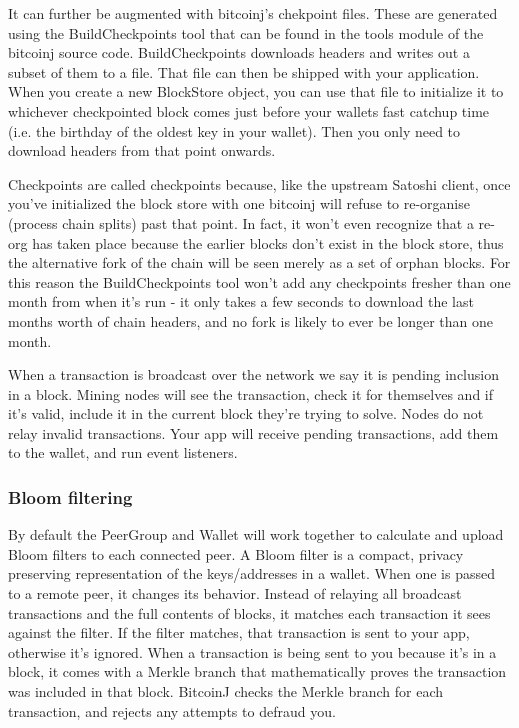 \documentclass[a4paper,12pt]{article}
\begin{document}
It can further be augmented with bitcoinj's chekpoint files. These are generated using the BuildCheckpoints tool that can be found in the tools module of the bitcoinj source code. BuildCheckpoints downloads headers and writes out a subset of them to a file. That file can then be shipped with your application. When you create a new BlockStore object, you can use that file to initialize it to whichever checkpointed block comes just before your wallets fast catchup time (i.e. the birthday of the oldest key in your wallet). Then you only need to download headers from that point onwards.

Checkpoints are called checkpoints because, like the upstream Satoshi client, once you've initialized the block store with one bitcoinj will refuse to re-organise (process chain splits) past that point. In fact, it won't even recognize that a re-org has taken place because the earlier blocks don't exist in the block store, thus the alternative fork of the chain will be seen merely as a set of orphan blocks. For this reason the BuildCheckpoints tool won't add any checkpoints fresher than one month from when it's run - it only takes a few seconds to download the last months worth of chain headers, and no fork is likely to ever be longer than one month.

When a transaction is broadcast over the network we say it is pending inclusion in a block. Mining nodes will see the transaction, check it for themselves and if it's valid, include it in the current block they're trying to solve. Nodes do not relay invalid transactions. Your app will receive pending transactions, add them to the wallet, and run event listeners. 

\subsubsection{Bloom filtering}
By default the PeerGroup and Wallet will work together to calculate and upload Bloom filters to each connected peer. A Bloom filter is a compact, privacy preserving representation of the keys/addresses in a wallet. When one is passed to a remote peer, it changes its behavior. Instead of relaying all broadcast transactions and the full contents of blocks, it matches each transaction it sees against the filter. If the filter matches, that transaction is sent to your app, otherwise it's ignored. When a transaction is being sent to you because it's in a block, it comes with a Merkle branch that mathematically proves the transaction was included in that block. BitcoinJ checks the Merkle branch for each transaction, and rejects any attempts to defraud you.
\end{document}
